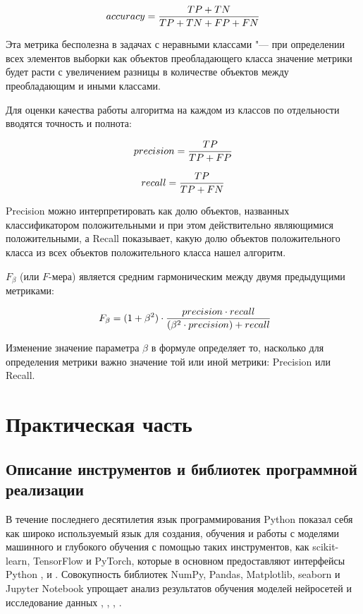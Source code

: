 \documentclass[bachelor, och, coursework]{SCWorks}
\begin{document}
        $$\large accuracy = \frac{TP + TN}{TP + TN + FP + FN}$$

        Эта метрика бесполезна в задачах с неравными классами "--- при
        определении всех элементов выборки как объектов преобладающего класса
        значение метрики будет расти с увеличением разницы в количестве объектов
        между преобладающим и иными классами.

        Для оценки качества работы алгоритма на каждом из классов по отдельности
        вводятся точность и полнота:

        $$\large precision = \frac{TP}{TP + FP}$$

        $$\large recall = \frac{TP}{TP + FN}$$

        Precision можно интерпретировать как долю объектов, названных
        классификатором положительными и при этом действительно являющимися
        положительными, а Recall показывает, какую долю объектов положительного
        класса из всех объектов положительного класса нашел алгоритм.

        $F_\beta$ (или $F$-мера) является средним гармоническим между двумя
        предыдущими метриками:

        $$\large \ F_\beta = (1 + \beta^2) \cdot \frac{precision \cdot
        recall}{(\beta^2 \cdot precision) + recall}$$

        Изменение значение параметра $\beta$ в формуле определяет то, насколько
        для определения метрики важно значение той или иной метрики: Precision
        или Recall.


\section{Практическая часть}

    \subsection{Описание инструментов и библиотек программной реализации}

        В течение последнего десятилетия язык программирования Python показал
        себя как широко используемый язык для создания, обучения и работы с
        моделями машинного и глубокого обучения с помощью таких инструментов,
        как scikit-learn, TensorFlow и PyTorch, которые в основном предоставляют
        интерфейсы Python \cite{fwsl}, \cite{fwtf} и \cite{fwpytorch}.
        Совокупность библиотек NumPy, Pandas, Matplotlib, seaborn и Jupyter
        Notebook упрощает анализ результатов обучения моделей нейросетей и
        исследование данных \cite{fwnumpy}, \cite{fwpandas},
        \cite{fwmatplotlib}, \cite{fwjupyter}.
\end{document}
